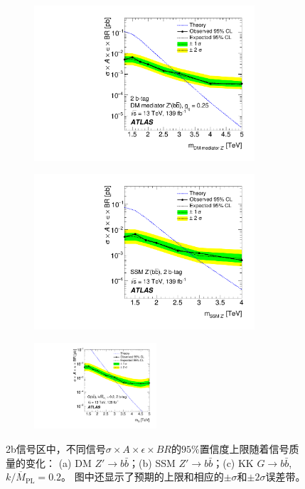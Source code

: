 \begin{figure}[!thbp]
  \begin{subfigure}{.5\textwidth}
  \centering
  \includegraphics[width=0.9\textwidth]{figs/fig_07a.pdf}
  \caption{}
  \end{subfigure}
  \begin{subfigure}{.5\textwidth}
  \centering
  \includegraphics[width=0.9\textwidth]{figs/fig_07b.pdf}
  \caption{}
  \end{subfigure}
\newline 
  \begin{subfigure}{.99\textwidth}
  \centering
  \includegraphics[width=0.5\textwidth]{figs/fig_07c.pdf}
  \caption{}
  \end{subfigure}
\caption{
  2b信号区中，不同信号$\sigma\times A \times \epsilon \times BR$的$95\%$置信度上限随着信号质量的变化：
  (a) DM $Z' \to b\bar{b}$；(b) SSM $Z' \to b\bar{b}$；(c) KK $G \to b\bar{b}$, $k/\overline{M}_\text{PL}=0.2$。
  图中还显示了预期的上限和相应的$\pm \sigma$和$\pm 2\sigma$误差带。
}
\label{fig:2b}
\end{figure}




